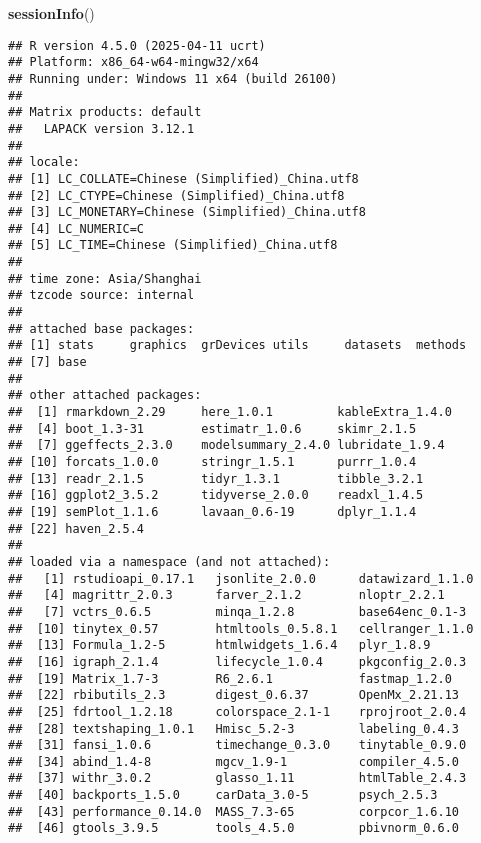 \documentclass[
  11pt,
]{article}
\newenvironment{Shaded}{\begin{snugshade}}{\end{snugshade}}
\newcommand{\FunctionTok}[1]{\textcolor[rgb]{0.13,0.29,0.53}{\textbf{#1}}}
\newcommand{\NormalTok}[1]{#1}
\begin{document}
\begin{Shaded}
\begin{Highlighting}[]
\FunctionTok{sessionInfo}\NormalTok{()}
\end{Highlighting}
\end{Shaded}

\begin{verbatim}
## R version 4.5.0 (2025-04-11 ucrt)
## Platform: x86_64-w64-mingw32/x64
## Running under: Windows 11 x64 (build 26100)
## 
## Matrix products: default
##   LAPACK version 3.12.1
## 
## locale:
## [1] LC_COLLATE=Chinese (Simplified)_China.utf8 
## [2] LC_CTYPE=Chinese (Simplified)_China.utf8   
## [3] LC_MONETARY=Chinese (Simplified)_China.utf8
## [4] LC_NUMERIC=C                               
## [5] LC_TIME=Chinese (Simplified)_China.utf8    
## 
## time zone: Asia/Shanghai
## tzcode source: internal
## 
## attached base packages:
## [1] stats     graphics  grDevices utils     datasets  methods  
## [7] base     
## 
## other attached packages:
##  [1] rmarkdown_2.29     here_1.0.1         kableExtra_1.4.0  
##  [4] boot_1.3-31        estimatr_1.0.6     skimr_2.1.5       
##  [7] ggeffects_2.3.0    modelsummary_2.4.0 lubridate_1.9.4   
## [10] forcats_1.0.0      stringr_1.5.1      purrr_1.0.4       
## [13] readr_2.1.5        tidyr_1.3.1        tibble_3.2.1      
## [16] ggplot2_3.5.2      tidyverse_2.0.0    readxl_1.4.5      
## [19] semPlot_1.1.6      lavaan_0.6-19      dplyr_1.1.4       
## [22] haven_2.5.4       
## 
## loaded via a namespace (and not attached):
##   [1] rstudioapi_0.17.1   jsonlite_2.0.0      datawizard_1.1.0   
##   [4] magrittr_2.0.3      farver_2.1.2        nloptr_2.2.1       
##   [7] vctrs_0.6.5         minqa_1.2.8         base64enc_0.1-3    
##  [10] tinytex_0.57        htmltools_0.5.8.1   cellranger_1.1.0   
##  [13] Formula_1.2-5       htmlwidgets_1.6.4   plyr_1.8.9         
##  [16] igraph_2.1.4        lifecycle_1.0.4     pkgconfig_2.0.3    
##  [19] Matrix_1.7-3        R6_2.6.1            fastmap_1.2.0      
##  [22] rbibutils_2.3       digest_0.6.37       OpenMx_2.21.13     
##  [25] fdrtool_1.2.18      colorspace_2.1-1    rprojroot_2.0.4    
##  [28] textshaping_1.0.1   Hmisc_5.2-3         labeling_0.4.3     
##  [31] fansi_1.0.6         timechange_0.3.0    tinytable_0.9.0    
##  [34] abind_1.4-8         mgcv_1.9-1          compiler_4.5.0     
##  [37] withr_3.0.2         glasso_1.11         htmlTable_2.4.3    
##  [40] backports_1.5.0     carData_3.0-5       psych_2.5.3        
##  [43] performance_0.14.0  MASS_7.3-65         corpcor_1.6.10     
##  [46] gtools_3.9.5        tools_4.5.0         pbivnorm_0.6.0     

\end{verbatim}
\end{document}
